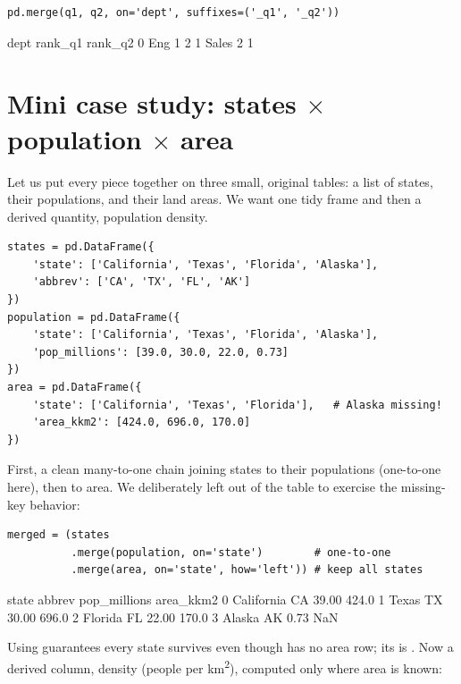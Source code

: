 \documentclass[11pt]{article}
\begin{document}
\begin{lstlisting}
pd.merge(q1, q2, on='dept', suffixes=('_q1', '_q2'))
\end{lstlisting}

\begin{outblock}
    dept  rank_q1  rank_q2
0    Eng        1        2
1  Sales        2        1
\end{outblock}

\section{Mini case study: states $\times$ population $\times$ area}

Let us put every piece together on three small, original tables: a list of states, their populations, and their land areas. We want one tidy frame and then a derived quantity, population density.

\begin{lstlisting}
states = pd.DataFrame({
    'state': ['California', 'Texas', 'Florida', 'Alaska'],
    'abbrev': ['CA', 'TX', 'FL', 'AK']
})
population = pd.DataFrame({
    'state': ['California', 'Texas', 'Florida', 'Alaska'],
    'pop_millions': [39.0, 30.0, 22.0, 0.73]
})
area = pd.DataFrame({
    'state': ['California', 'Texas', 'Florida'],   # Alaska missing!
    'area_kkm2': [424.0, 696.0, 170.0]
})
\end{lstlisting}

First, a clean many-to-one chain joining states to their populations (one-to-one here), then to area. We deliberately left  out of the  table to exercise the missing-key behavior:

\begin{lstlisting}
merged = (states
          .merge(population, on='state')        # one-to-one
          .merge(area, on='state', how='left')) # keep all states
\end{lstlisting}

\begin{outblock}
        state abbrev  pop_millions  area_kkm2
0  California     CA         39.00      424.0
1       Texas     TX         30.00      696.0
2     Florida     FL         22.00      170.0
3      Alaska     AK          0.73        NaN
\end{outblock}

Using  guarantees every state survives even though  has no area row; its  is . Now a derived column, density (people per km\textsuperscript{2}), computed only where area is known:
\end{document}
